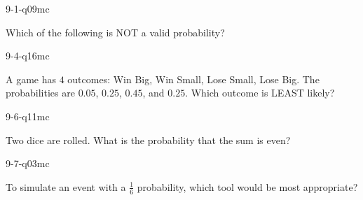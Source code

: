 \begin{practiceQuestion}{9-1-q09}{mc}
\begin{questionText}
Which of the following is NOT a valid probability?
\end{questionText}
\end{practiceQuestion}

\begin{practiceQuestion}{9-4-q16}{mc}
\begin{questionText}
A game has $4$ outcomes: Win Big, Win Small, Lose Small, Lose Big. The probabilities are $0.05$, $0.25$, $0.45$, and $0.25$. Which outcome is LEAST likely?
\end{questionText}
\end{practiceQuestion}

\begin{practiceQuestion}{9-6-q11}{mc}
\begin{questionText}
Two dice are rolled. What is the probability that the sum is even?
\end{questionText}
\end{practiceQuestion}

\begin{practiceQuestion}{9-7-q03}{mc}
\begin{questionText}
To simulate an event with a $\frac{1}{6}$ probability, which tool would be most appropriate?
\end{questionText}
\end{practiceQuestion}
